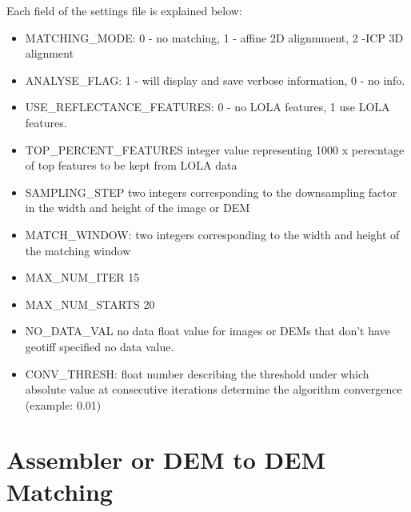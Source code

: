 \documentclass[12pt]{article}
\begin{document}
Each field of the settings file is explained below:
\begin{itemize}
\item{MATCHING\_MODE}: 0 - no matching, 1 - affine 2D alignmment, 2 -ICP 3D alignment\\
\item{ANALYSE\_FLAG}:  1 - will display and save verbose information, 0 - no info.\\
\item{USE\_REFLECTANCE\_FEATURES}: 0 - no LOLA features, 1 use LOLA features.\\ 
\item{TOP\_PERCENT\_FEATURES} integer value representing 1000 x perecntage of top features to be kept from LOLA data\\
\item{SAMPLING\_STEP} two integers corresponding to the downsampling factor in the width and height of the image or DEM\\
\item{MATCH\_WINDOW}: two integers corresponding to the width and height of the matching window\\
\item{MAX\_NUM\_ITER} 15\\
\item{MAX\_NUM\_STARTS} 20\\
\item{NO\_DATA\_VAL} no data float value for images or DEMs that don't have geotiff specified no data value.\\
\item{CONV\_THRESH}: float number describing the threshold under which absolute value at consecutive iterations determine 
                                the algorithm convergence (example: 0.01)\\
\end{itemize}


\section{Assembler or DEM to DEM Matching }
\label{sec:dem2dem}

\end{document}
